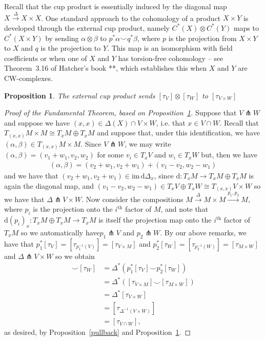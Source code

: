 \documentclass{amsart}          %
\newtheorem{proposition}[theorem]{Proposition}
\begin{document}
Recall that the cup product is essentially induced by the diagonal map $X \overset{\Delta}{\to} X \times X$.  One standard
approach to the cohomology of a product $X \times Y$ is developed through the external cup product, namely $C^*(X) \otimes C^*(Y)$
maps to $C^*(X \times Y)$ by sending $\alpha  \otimes \beta$ to $p^* \alpha \smile q^*\beta$, where $p$ is the projection from 
$X \times Y$ to $X$ and $q$ is the projection to $Y$.  This map is an isomorphism with field coefficients or when 
one of $X$ and $Y$ has torsion-free cohomology -- see Theorem~3.16 of Hatcher's book **, which establishes this when $X$ and
$Y$ are CW-complexes.

\begin{proposition}\label{externalcup}
The external cup product sends $[\tau_V] \otimes [\tau_W]$ to $[\tau_{V \times W}]$
\end{proposition}

\begin{proof}[Proof of the Fundamental Theorem, based on Proposition~\ref{externalcup}]
Suppose that $V\pitchfork W$ and suppose we have $(x,x)\in\Delta(X)\cap V\times W$, i.e. that $x\in V\cap W$. Recall that $T_{(x,x)}M\times M\cong T_xM\oplus T_xM$ and suppose that, under this identification, we have $(\alpha,\beta)\in T_{(x,x)}M\times M$. Since $V\pitchfork W$, we may write $(\alpha,\beta)=(v_1+w_1,v_2,w_2)$ for some $v_i\in T_xV$ and $w_i\in T_xW$ but, then we have\begin{align*}
(\alpha,\beta)=(v_2+w_1,v_2+w_1)+(v_1-v_2,w_2-w_1)
\end{align*}and we have that $(v_2+w_1,v_2+w_1)\in\mathrm{im}\,\mathrm{d}\Delta_x$, since $\mathrm{d}:T_xM\to T_xM\oplus T_xM$ is again the diagonal map, and $(v_1-v_2,w_2-w_1)\in T_xV\oplus T_xW\cong T_{(x,x)}V\times W$ so we have that $\Delta\pitchfork V\times W$. Now consider the compositions $M\stackrel{\Delta}{\to}M\times M\stackrel{p_1,p_2}{\longrightarrow}M$, where $p_i$ is the projection onto the $i^\text{th}$ factor of $M$, and note that $\mathrm{d}(p_i)_x:T_xM\oplus T_xM\to T_xM$ is itself the projection map onto the $i^\text{th}$ factor of $T_xM$ so we automatically have$p_1\pitchfork V$ and $p_2\pitchfork W$. By our above remarks, we have that $p_1^*[\tau_V]=\left[\tau_{p_1^{-1}(V)}\right]=[\tau_{V\times M}]$ and $p_2^*[\tau_W]=\left[\tau_{p_2^{-1}(W)}\right]=[\tau_{M\times W}]$ and $\Delta\pitchfork V\times W$ so we obtain\begin{align*}
[\tau_V]\smile[\tau_W]&=\Delta^*(p_1^*[\tau_V]\smile p_2^*[\tau_W])\\&=\Delta^*([\tau_{V\times M}]\smile[\tau_{M\times W}])\\&=\Delta^*[\tau_{V\times W}]\\&=\left[\tau_{\Delta^{-1}(V\times W)}\right]\\&=[\tau_{V\cap W}],
\end{align*}as desired, by Proposition~\ref{pullback} and Proposition~\ref{externalcup}.
\end{proof}
\end{document}
